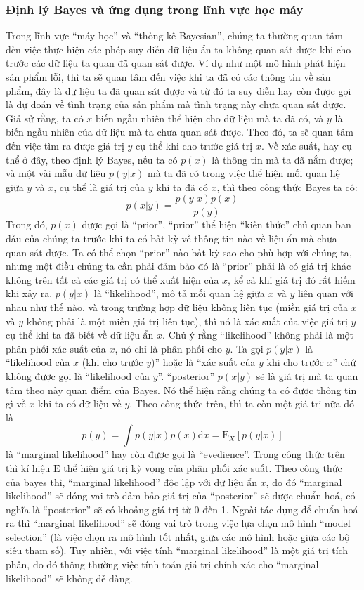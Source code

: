         \subsubsection{Định lý Bayes và ứng dụng trong lĩnh vực học máy}
        Trong lĩnh vực ``máy học'' và ``thống kê Bayesian'', chúng ta thường quan tâm đến việc thực hiện các phép suy diễn dữ liệu ẩn ta không quan sát được khi cho trước các dữ liệu ta quan đã quan sát được. Ví dụ như một mô hình phát hiện sản phẩm lỗi, thì ta sẽ quan tâm đến việc khi ta đã có các thông tin về sản phẩm, đây là dữ liệu ta đã quan sát được và từ đó ta suy diễn hay còn được gọi là dự đoán về tình trạng của sản phẩm mà tình trạng này chưa quan sát được. Giả sử rằng, ta có $x$ biến ngẫu nhiên thể hiện cho dữ liệu mà ta đã có, và $y$ là biến ngẫu nhiên của dữ liệu mà ta chưa quan sát được. Theo đó, ta sẽ quan tâm đến việc tìm ra được giá trị $y$ cụ thể khi cho trước giá trị $x$. Về xác suất, hay cụ thể ở đây, theo định lý Bayes, nếu ta có $p(x)$ là thông tin mà ta đã nắm được; và một vài mẫu dữ liệu $p(y|x)$ mà ta đã có trong việc thể hiện mối quan hệ giữa $y$ và $x$, cụ thể là giá trị của $y$ khi ta đã có $x$, thì theo công thức Bayes ta có: $$p(x|y) = \frac{p(y|x)p(x)}{p(y)}$$
        Trong đó, $p(x)$ được gọi là ``prior'', ``prior'' thể hiện ``kiến thức'' chủ quan ban đầu của chúng ta trước khi ta có bất kỳ về thông tin nào về liệu ẩn mà chưa quan sát được.
        Ta có thể chọn ``prior'' nào bất kỳ sao cho phù hợp với chúng ta, nhưng một điều chúng ta cần phải đảm bảo đó là ``prior'' phải là có giá trị khác không trên tất cả các giá trị có thể xuất hiện của $x$, kể cả khi giá trị đó rất hiếm khi xảy ra.
        $p(y|x)$ là ``likelihood'', mô tả mối quan hệ giữa $x$ và $y$ liên quan với nhau như thế nào, và trong trường hợp dữ liệu không liên tục (miền giá trị của $x$ và $y$ không phải là một miền giá trị liên tục), thì nó là xác suất của việc giá trị $y$ cụ thể khi ta đã biết về dữ liệu ẩn $x$. Chú ý rằng ``likelihood'' không phải là một phân phối xác suất của $x$, nó chỉ là phân phối cho $y$. Ta gọi $p(y|x)$ là ``likelihood của $x$ (khi cho trước $y$)'' hoặc là ``xác suất của $y$ khi cho trước $x$'' chứ không được gọi là ``likelihood của $y$''\cite{MacKay2003}.
        ``posterior'' $p(x|y)$ sẽ là giá trị mà ta quan tâm theo này quan điểm của Bayes. Nó thể hiện rằng chúng ta có được thông tin gì về $x$ khi ta có dữ liệu về $y$.
        Theo công thức trên, thì ta còn một giá trị nữa đó là $$p(y) = \int {p(y|x)p(x)\text{d}x = \mathrm{E}_X[p(y|x)]}$$ là ``marginal likelihood'' hay còn được gọi là ``evedience''. Trong công thức trên thì kí hiệu $\mathrm{E}$ thể hiện giá trị kỳ vọng của phân phối xác suất. Theo công thức của bayes thì, ``marginal likelihood'' độc lập với dữ liệu ẩn $x$, do đó ``marginal likelihood'' sẽ đóng vai trò đảm bảo giá trị của ``posterior'' sẽ được chuẩn hoá, có nghĩa là ``posterior'' sẽ có khoảng giá trị từ 0 đến 1. Ngoài tác dụng để chuẩn hoá ra thì ``marginal likelihood'' sẽ đóng vai trò trong việc lựa chọn mô hình ``model selection'' (là việc chọn ra mô hình tốt nhất, giữa các mô hình hoặc giữa các bộ siêu tham số). Tuy nhiên, với việc tính ``marginal likelihood'' là một giá trị tích phân, do đó thông thường việc tính toán giá trị chính xác cho ``marginal likelihood'' sẽ không dễ dàng. 


